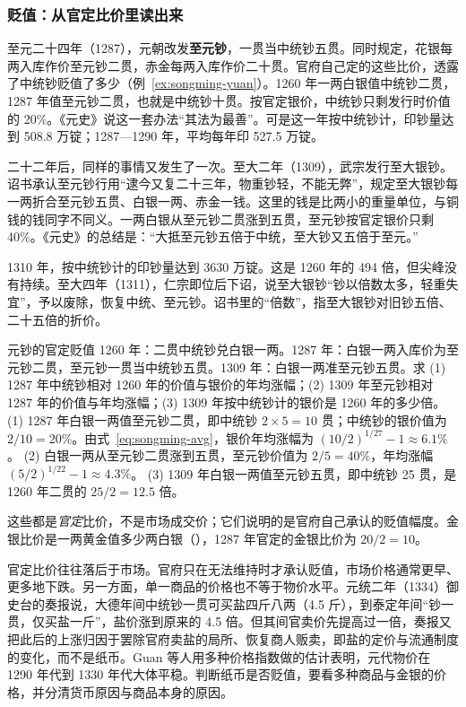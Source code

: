 \subsubsection{贬值：从官定比价里读出来}
至元二十四年（1287），元朝改发\textbf{至元钞}，一贯当中统钞五贯。同时规定，花银每两入库作价至元钞二贯，赤金每两入库作价二十贯\cite{yuanshi}。官府自己定的这些比价，透露了中统钞贬值了多少（例~\ref{ex:songming-yuan}）。1260 年一两白银值中统钞二贯，1287 年值至元钞二贯，也就是中统钞十贯。按官定银价，中统钞只剩发行时价值的 20\%。《元史》说这一套办法“其法为最善”\cite{yuanshi}。可是这一年按中统钞计，印钞量达到 508.8 万锭；1287—1290 年，平均每年印 527.5 万锭。

二十二年后，同样的事情又发生了一次。至大二年（1309），武宗发行至大银钞。诏书承认至元钞行用“逮今又复二十三年，物重钞轻，不能无弊”，规定至大银钞每一两折合至元钞五贯、白银一两、赤金一钱\cite{yuanshi}。这里的钱是比两小的重量单位，与铜钱的钱同字不同义。一两白银从至元钞二贯涨到五贯，至元钞按官定银价只剩 40\%。《元史》的总结是：“大抵至元钞五倍于中统，至大钞又五倍于至元。”\cite{yuanshi}

1310 年，按中统钞计的印钞量达到 3630 万锭。这是 1260 年的 494 倍，但尖峰没有持续。至大四年（1311），仁宗即位后下诏，说至大银钞“钞以倍数太多，轻重失宜”，予以废除，恢复中统、至元钞\cite{yuanshi}。诏书里的“倍数”，指至大银钞对旧钞五倍、二十五倍的折价。

\begin{example}{元钞的官定贬值}\label{ex:songming-yuan}
1260 年：二贯中统钞兑白银一两。1287 年：白银一两入库价为至元钞二贯，至元钞一贯当中统钞五贯。1309 年：白银一两准至元钞五贯。求 (1) 1287 年中统钞相对 1260 年的价值与银价的年均涨幅；(2) 1309 年至元钞相对 1287 年的价值与年均涨幅；(3) 1309 年按中统钞计的银价是 1260 年的多少倍。
\solution (1) 1287 年白银一两值至元钞二贯，即中统钞 $2\times5=10$ 贯；中统钞的银价值为 $2/10=20\%$。由式~\eqref{eq:songming-avg}，银价年均涨幅为 $(10/2)^{1/27}-1\approx6.1\%$。
(2) 白银一两从至元钞二贯涨到五贯，至元钞价值为 $2/5=40\%$，年均涨幅 $(5/2)^{1/22}-1\approx4.3\%$。
(3) 1309 年白银一两值至元钞五贯，即中统钞 25 贯，是 1260 年二贯的 $25/2=12.5$ 倍。

这些都是\emph{官定}比价，不是市场成交价；它们说明的是官府自己承认的贬值幅度。金银比价是一两黄金值多少两白银（），1287 年官定的金银比价为 $20/2=10$。
\end{example}

\begin{pitfall}
官定比价往往落后于市场。官府只在无法维持时才承认贬值，市场价格通常更早、更多地下跌。另一方面，单一商品的价格也不等于物价水平。元统二年（1334）御史台的奏报说，大德年间中统钞一贯可买盐四斤八两（4.5 斤），到泰定年间“钞一贯，仅买盐一斤”\cite{yuanshi}，盐价涨到原来的 4.5 倍。但其间官卖价先提高过一倍，奏报又把此后的上涨归因于罢除官府卖盐的局所、恢复商人贩卖，即盐的定价与流通制度的变化，而不是纸币。Guan 等人用多种价格指数做的估计表明，元代物价在 1290 年代到 1330 年代大体平稳\cite{guan2024}。判断纸币是否贬值，要看多种商品与金银的价格，并分清货币原因与商品本身的原因。
\end{pitfall}

